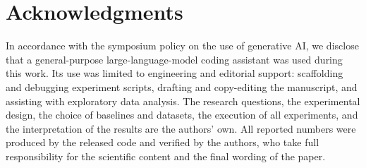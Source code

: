 \section*{Acknowledgments}
\label{sec:acknowledgments}

In accordance with the symposium policy on the use of generative AI, we disclose that a general-purpose large-language-model coding assistant was used during this work.
Its use was limited to engineering and editorial support: scaffolding and debugging experiment scripts, drafting and copy-editing the manuscript, and assisting with exploratory data analysis.
The research questions, the experimental design, the choice of baselines and datasets, the execution of all experiments, and the interpretation of the results are the authors' own.
All reported numbers were produced by the released code and verified by the authors, who take full responsibility for the scientific content and the final wording of the paper.
